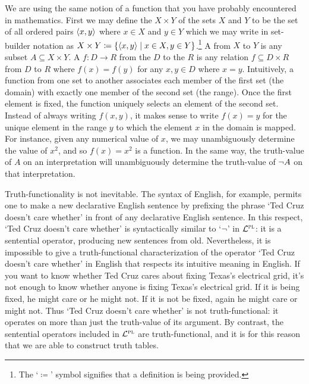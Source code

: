 We are using the same notion of a function that you have probably encountered in mathematics.
First we may define the  $X \times Y$ of the sets $X$ and $Y$ to be the set of all ordered pairs $\langle x, y\rangle$ where $x \in X$ and $y \in Y$ which we may write in set-builder notation as $X \times Y \coloneq \lbrace\langle x, y\rangle \mid x \in X, y \in Y\rbrace$.\footnote{The `$\coloneq$' symbol signifies that a definition is being provided.}
A  from $X$ to $Y$ is any subset $A \subseteq X \times Y$.
A  $f: D \to R$ from the  $D$ to the  $R$ is any relation $f \subseteq D \times R$ from $D$ to $R$ where $f(x) = f(y)$ for any $x, y \in D$ where $x = y$. 
Intuitively, a function from one set to another associates each member of the first set (the domain) with exactly one member of the second set (the range).
Once the first element is fixed, the function uniquely selects an element of the second set.
Instead of always writing $f(x, y)$, it makes sense to write $f(x) = y$ for the unique element in the range $y$ to which the element $x$ in the domain is mapped.
For instance, given any numerical value of $x$, we may unambiguously determine the value of $x^{2}$, and so $f(x)=x^{2}$ is a function.
In the same way, the truth-value of $A$ on an interpretation will unambiguously determine the truth-value of $\neg A$ on that interpretation.

Truth-functionality is not inevitable.
The syntax of English, for example, permits one to make a new declarative English sentence by prefixing the phrase `Ted Cruz doesn't care whether' in front of any declarative English sentence.
In this respect, `Ted Cruz doesn't care whether' is syntactically similar to `$\neg$' in $\mathcal{L}^{\textsc{pl}}$: it is a sentential operator, producing new sentences from old. 
Nevertheless, it is impossible to give a truth-functional characterization of the operator `Ted Cruz doesn't care whether' in English that respects its intuitive meaning in English.
If you want to know whether Ted Cruz cares about fixing Texas's electrical grid, it's not enough to know whether anyone is fixing Texas's electrical grid.
If it is being fixed, he might care or he might not.
If it is not be fixed, again he might care or might not. 
Thus `Ted Cruz doesn't care whether' is not truth-functional: it operates on more than just the truth-value of its argument. %
By contrast, the sentential operators included in $\mathcal{L}^{\textsc{pl}}$ are truth-functional, and it is for this reason that we are able to construct truth tables.



